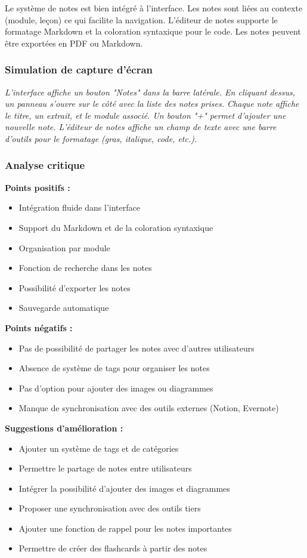 \documentclass[12pt,a4paper]{article}
\begin{document}
Le système de notes est bien intégré à l'interface. Les notes sont liées au contexte (module, leçon) ce qui facilite la navigation. L'éditeur de notes supporte le formatage Markdown et la coloration syntaxique pour le code. Les notes peuvent être exportées en PDF ou Markdown.

\subsubsection{Simulation de capture d'écran}

\textit{L'interface affiche un bouton "Notes" dans la barre latérale. En cliquant dessus, un panneau s'ouvre sur le côté avec la liste des notes prises. Chaque note affiche le titre, un extrait, et le module associé. Un bouton "+" permet d'ajouter une nouvelle note. L'éditeur de notes affiche un champ de texte avec une barre d'outils pour le formatage (gras, italique, code, etc.).}

\subsubsection{Analyse critique}

\textbf{Points positifs :}
\begin{itemize}
    \item Intégration fluide dans l'interface
    \item Support du Markdown et de la coloration syntaxique
    \item Organisation par module
    \item Fonction de recherche dans les notes
    \item Possibilité d'exporter les notes
    \item Sauvegarde automatique
\end{itemize}

\textbf{Points négatifs :}
\begin{itemize}
    \item Pas de possibilité de partager les notes avec d'autres utilisateurs
    \item Absence de système de tags pour organiser les notes
    \item Pas d'option pour ajouter des images ou diagrammes
    \item Manque de synchronisation avec des outils externes (Notion, Evernote)
\end{itemize}

\textbf{Suggestions d'amélioration :}
\begin{itemize}
    \item Ajouter un système de tags et de catégories
    \item Permettre le partage de notes entre utilisateurs
    \item Intégrer la possibilité d'ajouter des images et diagrammes
    \item Proposer une synchronisation avec des outils tiers
    \item Ajouter une fonction de rappel pour les notes importantes
    \item Permettre de créer des flashcards à partir des notes
\end{itemize}
\end{document}
